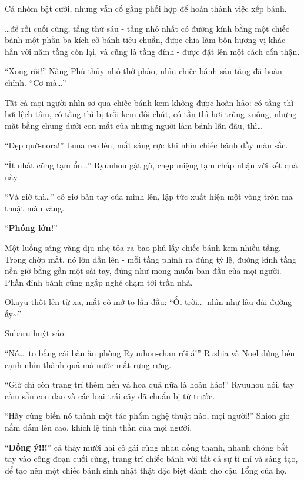 \documentclass[../main.tex]{subfiles}
\begin{document}
Cả nhóm bật cười, nhưng vẫn cố gắng phối hợp để hoàn thành việc xếp bánh.

\dots để rồi cuối cùng, tầng thứ sáu - tầng nhỏ nhất có đường kính bằng một chiếc bánh một phần ba kích cỡ bánh tiêu chuẩn, được chia làm bốn hương vị khác hẳn với năm tầng còn lại, và cũng là tầng đỉnh - được đặt lên một cách cẩn thận.

``Xong rồi!'' Nàng Phù thủy nhỏ thở phào, nhìn chiếc bánh sáu tầng đã hoàn chỉnh. ``Cơ mà\dots''

Tất cả mọi người nhìn sơ qua chiếc bánh kem không được hoàn hảo: có tầng thì hơi lệch tâm, có tầng thì bị trồi kem đôi chút, có tần thì hơi trũng xuống, nhưng mặt bằng chung dưới con mắt của những người làm bánh lần đầu, thì\dots

``Đẹp quớ-nora!'' Luna reo lên, mắt sáng rực khi nhìn chiếc bánh đầy màu sắc.

``Ít nhất cũng tạm ổn\dots'' Ryuuhou gật gù, chẹp miệng tạm chấp nhận với kết quả này.

``Và giờ thì\dots'' cô giơ bàn tay của mình lên, lập tức xuất hiện một vòng tròn ma thuật màu vàng.

``\textbf{Phóng lớn!}''

Một luồng sáng vàng dịu nhẹ tỏa ra bao phủ lấy chiếc bánh kem nhiều tầng. Trong chớp mắt, nó lớn dần lên - mỗi tầng phình ra đúng tỷ lệ, đường kính tầng nền giờ bằng gần một sải tay, đúng như mong muốn ban đầu của mọi người. Phần đỉnh bánh cũng ngấp nghé chạm tới trần nhà.

Okayu thốt lên từ xa, mắt cô mở to lần đầu: ``Ối trời\dots\ nhìn như lâu đài đường ấy\~{}''

Subaru huýt sáo:

``Nó\dots\ to bằng cái bàn ăn phòng Ryuuhou-chan rồi á!'' Rushia và Noel đứng bên cạnh nhìn thành quả mà nước mắt rưng rưng.

``Giờ chỉ còn trang trí thêm nến và hoa quả nữa là hoàn hảo!'' Ryuuhou nói, tay cầm sẵn con dao và các loại trái cây đã chuẩn bị từ trước.

``Hãy cùng biến nó thành một tác phẩm nghệ thuật nào, mọi người!'' Shion giơ nắm đấm lên cao, khích lệ tinh thần của mọi người.

``\textbf{Đồng ý!!!}'' cả thảy mười hai cô gái cùng nhau đồng thanh, nhanh chóng bắt tay vào công đoạn cuối cùng, trang trí chiếc bánh với tất cả sự tỉ mỉ và sáng tạo, để tạo nên một chiếc bánh sinh nhật thật đặc biệt dành cho cậu Tổng của họ.

\ct
\end{document}
